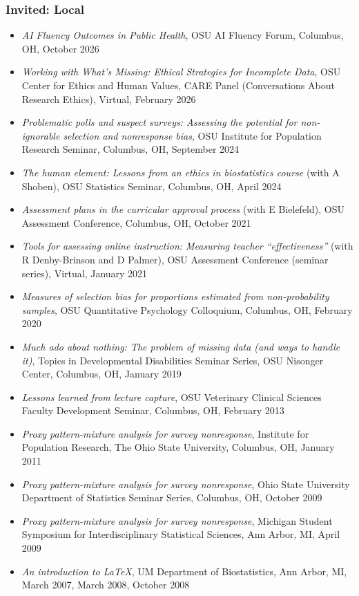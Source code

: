 \documentclass[
  english,
  letterpaper,
  DIV=11,
  numbers=noendperiod]{scrartcl}
\providecommand{\tightlist}{%
  \setlength{\itemsep}{0pt}\setlength{\parskip}{0pt}}
\begin{document}
\subsubsection{Invited: Local}\label{invited-local}

\begin{itemize}
\tightlist
\item
  \emph{AI Fluency Outcomes in Public Health}, OSU AI Fluency Forum,
  Columbus, OH, October 2026
\item
  \emph{Working with What's Missing: Ethical Strategies for Incomplete
  Data}, OSU Center for Ethics and Human Values, CARE Panel
  (Conversations About Research Ethics), Virtual, February 2026
\item
  \emph{Problematic polls and suspect surveys: Assessing the potential
  for non-ignorable selection and nonresponse bias}, OSU Institute for
  Population Research Seminar, Columbus, OH, September 2024
\item
  \emph{The human element: Lessons from an ethics in biostatistics
  course} (with A Shoben), OSU Statistics Seminar, Columbus, OH, April
  2024
\item
  \emph{Assessment plans in the curricular approval process} (with E
  Bielefeld), OSU Assessment Conference, Columbus, OH, October 2021
\item
  \emph{Tools for assessing online instruction: Measuring teacher
  ``effectiveness''} (with R Denby-Brinson and D Palmer), OSU Assessment
  Conference (seminar series), Virtual, January 2021
\item
  \emph{Measures of selection bias for proportions estimated from
  non-probability samples}, OSU Quantitative Psychology Colloquium,
  Columbus, OH, February 2020
\item
  \emph{Much ado about nothing: The problem of missing data (and ways to
  handle it)}, Topics in Developmental Disabilities Seminar Series, OSU
  Nisonger Center, Columbus, OH, January 2019
\item
  \emph{Lessons learned from lecture capture}, OSU Veterinary Clinical
  Sciences Faculty Development Seminar, Columbus, OH, February 2013
\item
  \emph{Proxy pattern-mixture analysis for survey nonresponse},
  Institute for Population Research, The Ohio State University,
  Columbus, OH, January 2011
\item
  \emph{Proxy pattern-mixture analysis for survey nonresponse}, Ohio
  State University Department of Statistics Seminar Series, Columbus,
  OH, October 2009
\item
  \emph{Proxy pattern-mixture analysis for survey nonresponse}, Michigan
  Student Symposium for Interdisciplinary Statistical Sciences, Ann
  Arbor, MI, April 2009
\item
  \emph{An introduction to LaTeX}, UM Department of Biostatistics, Ann
  Arbor, MI, March 2007, March 2008, October 2008
\end{itemize}
\end{document}
